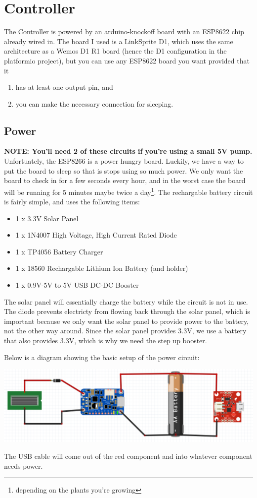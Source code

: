 \section{Controller}
The Controller is powered by an arduino-knockoff board with an ESP8622 chip already wired in.
The board I used is a LinkSprite D1, which uses the same architecture as a Wemos D1 R1 board (hence the D1 configuration in the platformio project), but you can use any ESP8622 board you want provided that it
\begin{enumerate}
    \item has at least one output pin, and
    \item you can make the necessary connection for sleeping.
\end{enumerate}

\subsection{Power}
\textbf{NOTE: You'll need 2 of these circuits if you're using a small 5V pump.}\\
Unfortuately, the ESP8266 is a power hungry board.
Luckily, we have a way to put the board to sleep so that is stops using so much power.
We only want the board to check in for a few seconds every hour, and in the worst case the board will be running for 5 minutes maybe twice a day\footnote{depending on the plants you're growing}.
The rechargable battery circuit is fairly simple, and uses the following items:
\begin{itemize}
    \item 1 x 3.3V Solar Panel
    \item 1 x 1N4007 High Voltage, High Current Rated Diode
    \item 1 x TP4056 Battery Charger
    \item 1 x 18560 Rechargable Lithium Ion Battery (and holder)
    \item 1 x 0.9V-5V to 5V USB DC-DC Booster
\end{itemize}

The solar panel will essentially charge the battery while the circuit is not in use.
The diode prevents electricty from flowing back through the solar panel, which is important because we only want the solar panel to provide power to the battery, not the other way around.
Since the solar panel provides 3.3V, we use a battery that also provides 3.3V, which is why we need the step up booster.

Below is a diagram showing the basic setup of the power circuit:
\begin{center}
\includegraphics[width=\textwidth]{controller/solar-circuit.png}
\end{center}
The USB cable will come out of the red component and into whatever component needs power.

